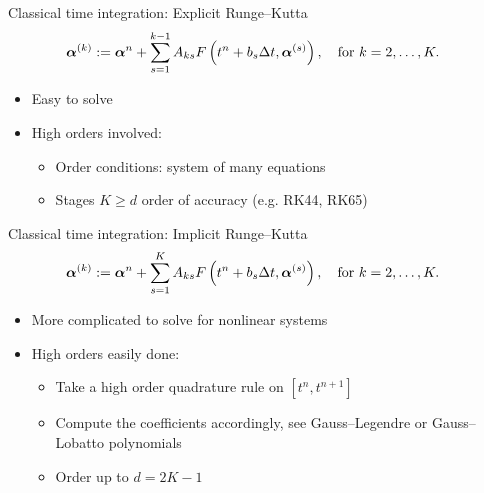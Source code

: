 \documentclass[aspectratio=169]{beamer}
\begin{document}
\begin{frame}{Classical time integration: Explicit Runge--Kutta}
\begin{align*}
	&\boldsymbol{\alpha}^{(k)}:=\boldsymbol{\alpha}^n+\sum_{s=1}^{k-1} A_{ks} F\left(t^n+b_s\Delta t,\boldsymbol{\alpha}^{(s)}\right), \quad \text{for } k=2,\dots, K.
\end{align*}

\begin{itemize}
\item Easy to solve
\item High orders involved:
\begin{itemize}
\item Order conditions: system of many equations
\item Stages  $K\geq d$ order of accuracy (e.g. RK44, RK65) 
\end{itemize}
\end{itemize} 
 
\end{frame}

\begin{frame}{Classical time integration: Implicit Runge--Kutta}
\begin{align*}
	&\boldsymbol{\alpha}^{(k)}:=\boldsymbol{\alpha}^n+\sum_{s=1}^{K} A_{ks} F\left(t^n+b_s\Delta t,\boldsymbol{\alpha}^{(s)}\right), \quad \text{for } k=2,\dots, K.
\end{align*}

\begin{itemize}
\item More complicated to solve for nonlinear systems
\item High orders easily done:
\begin{itemize}
\item Take a high order quadrature rule on $[t^n,t^{n+1}]$
\item Compute the coefficients accordingly, see Gauss--Legendre or Gauss--Lobatto polynomials
\item Order up to $d=2K-1$ 
\end{itemize}
\end{itemize} 
 
\end{frame}
\end{document}
